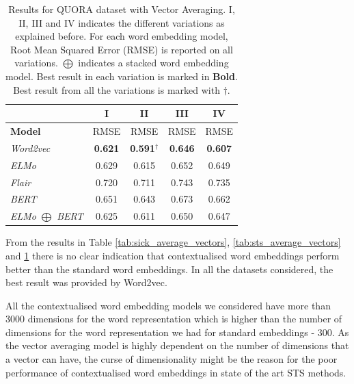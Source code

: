 \begin{enumerate}
\begin{table}[htb]
{\begin{tabular}{|l|c|c|c|c|}
			\hline
			& \multicolumn{1}{c|}{\textbf{I}} & \multicolumn{1}{c|}{\textbf{II}}             & \multicolumn{1}{c|}{\textbf{III}}  &    
			\multicolumn{1}{c|}{\textbf{IV}} \\ 
			\hline
			\multicolumn{1}{|l|}{\textbf{Model}} & RMSE   & RMSE     &  RMSE & RMSE 
			\\ \hline
			\textit{Word2vec}  
			& \textbf{0.621}                      & \textbf{0.591}$^{\dagger}$    
			& \textbf{0.646}                      & \textbf{0.607}       \\
			\textit{ELMo}  
			& 0.629                      & 0.615    
			& 0.652                      & 0.649       \\
			\textit{Flair}  
			& 0.720                      & 0.711    
			& 0.743                      & 0.735       \\
			\textit{BERT}  
			& 0.651                      & 0.643    
			& 0.673                      & 0.662       \\
			\textit{ELMo $\bigoplus$ BERT}  
			& 0.625                      & 0.611    
			& 0.650                      & 0.647       \\	
			\hline
		\end{tabular}
	}
	\caption[Results for QUORA with Vector Averaging]{Results for QUORA dataset with Vector Averaging. I, II, III and IV indicates the different variations as explained before. For each word embedding model, Root Mean Squared Error (RMSE) is reported on all variations. $\bigoplus$ indicates a stacked word embedding model. Best result in each variation is marked in \textbf{Bold}. Best result from all the variations is marked with ${\dagger}$. }  
	\label{tab:quora_average_vectors}
\end{table}

	From the results in Table \ref{tab:sick_average_vectors}, \ref{tab:sts_average_vectors} and \ref{tab:quora_average_vectors} there is no clear indication that contextualised word embeddings perform better than the standard word embeddings. In all the datasets considered, the best result was provided by Word2vec. 
	
	All the contextualised word embedding models we considered have more than 3000 dimensions for the word representation which is higher than the number of dimensions for the word representation we had for standard embeddings - 300. As the vector averaging model is highly dependent on the number of dimensions that a vector can have, the curse of dimensionality might be the reason for the poor performance of contextualised word embeddings in state of the art STS methods. 


\end{enumerate}

